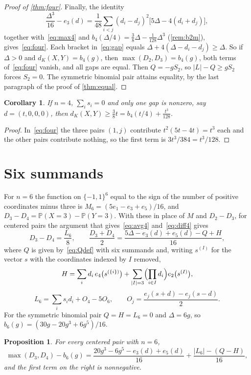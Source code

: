\documentclass[11pt,a4paper]{article}
\numberwithin{equation}{section}
\newtheorem{corollary}[theorem]{Corollary}
\newtheorem{proposition}[theorem]{Proposition}
\theoremstyle{remark}
\newcommand{\Pp}{\mathbb P}
\begin{document}
\begin{proof}[Proof of \cref{thm:four}]
Finally, the identity
\begin{equation}\label{eq:gap}
\frac{\Delta^3}{16}-e_3(d)=\frac1{48}\sum_{i<j}(d_i-d_j)^2\bigl[5\Delta-4(d_i+d_j)\bigr],
\end{equation}
together with~\eqref{eq:max4} and $b_4(\Delta/4)=\frac38\Delta-\frac1{128}\Delta^3$ (\cref{rem:b2m}), gives~\eqref{eq:four}. Each bracket in~\eqref{eq:gap} equals $\Delta+4(\Delta-d_i-d_j)\ge\Delta$. So if $\Delta>0$ and $d_K(X,Y)=b_4(g)$, then $\max(D_2,D_3)=b_4(g)$, both terms of~\eqref{eq:four} vanish, and all gaps are equal. Then $Q=-gS_2$, so $|L|-Q\ge gS_2$ forces $S_2=0$. The symmetric binomial pair attains equality, by the last paragraph of the proof of \cref{thm:equal}.
\end{proof}

\begin{corollary}\label{cor:single}
If $n=4$, $\sum_is_i=0$ and only one gap is nonzero, say $d=(t,0,0,0)$, then $d_K(X,Y)\ge\frac38t=b_4(t/4)+\frac{t^3}{128}$.
\end{corollary}

\begin{proof}
In~\eqref{eq:four} the three pairs $(1,j)$ contribute $t^2(5t-4t)=t^3$ each and the other pairs contribute nothing, so the first term is $3t^3/384=t^3/128$.
\end{proof}

\section{Six summands}\label{sec:six}
For $n=6$ the function on $\{-1,1\}^6$ equal to the sign of the number of positive coordinates minus three is $M_6=(5e_1-e_3+e_5)/16$, and $D_3-D_4=\Pp(X=3)-\Pp(Y=3)$. With these in place of $M$ and $D_2-D_3$, for centered pairs the argument that gives~\eqref{eq:avg4} and~\eqref{eq:diff4} gives
\[
D_3-D_4=\frac{L_6}8,\qquad \frac{D_3+D_4}2=\frac{5\Delta-e_3(d)+e_5(d)-Q+H}{16},
\]
where $Q$ is given by~\eqref{eq:Qdef} with six summands and, writing $s^{(I)}$ for the vector $s$ with the coordinates indexed by $I$ removed,
\[
H=\sum_i d_i\,e_4\bigl(s^{(\{i\})}\bigr)+\sum_{|I|=3}\Bigl(\prod_{i\in I}d_i\Bigr)e_2\bigl(s^{(I)}\bigr),
\]
\[
L_6=\sum_i s_id_i+O_4-5O_6,\qquad O_j=\frac{e_j(s+d)-e_j(s-d)}2 .
\]
For the symmetric binomial pair $Q=H=L_6=0$ and $\Delta=6g$, so $b_6(g)=(30g-20g^3+6g^5)/16$.

\begin{proposition}\label{prop:six}
For every centered pair with $n=6$,
\begin{equation}\label{eq:six}
\max(D_3,D_4)-b_6(g)=\frac{20g^3-6g^5-e_3(d)+e_5(d)}{16}+\frac{|L_6|-(Q-H)}{16},
\end{equation}
and the first term on the right is nonnegative.
\end{proposition}
\end{document}
